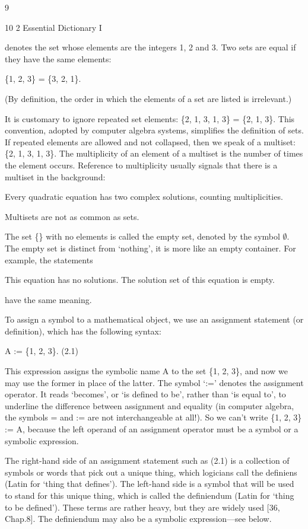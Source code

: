 \documentclass[11pt]{article}
\theoremstyle{plain}
\theoremstyle{definition}
\begin{document}
9

10 2 Essential Dictionary I

denotes the set whose elements are the integers 1, 2 and 3. Two sets are equal if they have the same elements:

\{1, 2, 3\} = \{3, 2, 1\}.

(By definition, the order in which the elements of a set are listed is irrelevant.)

It is customary to ignore repeated set elements: \{2, 1, 3, 1, 3\} = \{2, 1, 3\}. This convention, adopted by computer algebra systems, simplifies the definition of sets. If repeated elements are allowed and not collapsed, then we speak of a multiset: \{2, 1, 3, 1, 3\}. The multiplicity of an element of a multiset is the number of times the element occurs. Reference to multiplicity usually signals that there is a multiset in the background:

Every quadratic equation has two complex solutions, counting multiplicities.

Multisets are not as common as sets.

The set \{\} with no elements is called the empty set, denoted by the symbol $\emptyset$. The empty set is distinct from `nothing', it is more like an empty container. For example, the statements

This equation has no solutions. The solution set of this equation is empty.

have the same meaning.

To assign a symbol to a mathematical object, we use an assignment statement (or definition), which has the following syntax:

A := \{1, 2, 3\}. (2.1)

This expression assigns the symbolic name A to the set \{1, 2, 3\}, and now we may use the former in place of the latter. The symbol `:=' denotes the assignment operator. It reads `becomes', or `is defined to be', rather than `is equal to', to underline the difference between assignment and equality (in computer algebra, the symbols = and := are not interchangeable at all!). So we can't write \{1, 2, 3\} := A, because the left operand of an assignment operator must be a symbol or a symbolic expression.

The right-hand side of an assignment statement such as (2.1) is a collection of symbols or words that pick out a unique thing, which logicians call the definiens (Latin for `thing that defines'). The left-hand side is a symbol that will be used to stand for this unique thing, which is called the definiendum (Latin for `thing to be defined'). These terms are rather heavy, but they are widely used [36, Chap.8]. The definiendum may also be a symbolic expression---see below.
\end{document}
